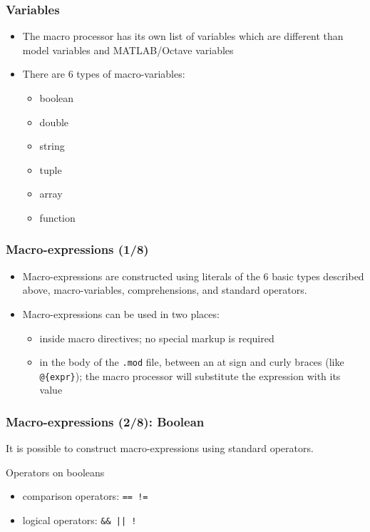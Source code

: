\documentclass{beamer}
\begin{document}
\begin{frame}
\frametitle{Variables}
\begin{itemize}
\item The macro processor has its own list of variables which are different than model variables and MATLAB/Octave variables
\item There are 6 types of macro-variables:
  \begin{itemize}
  \item boolean
  \item double
  \item string
  \item tuple
  \item array
  \item function
  \end{itemize}
\end{itemize}
\end{frame}

\begin{frame}[fragile=singleslide]
  \frametitle{Macro-expressions (1/8)}
  \begin{itemize}
    \item Macro-expressions are constructed using literals of the 6 basic types
      described above, macro-variables, comprehensions, and standard operators.
    \item Macro-expressions can be used in two places:
      \begin{itemize}
      \item inside macro directives; no special markup is required
      \item in the body of the \texttt{.mod} file, between an at sign and curly braces (like \verb+@{expr}+); the macro processor will substitute the expression with its value
      \end{itemize}
  \end{itemize}
\end{frame}


\begin{frame}[fragile=singleslide]
  \frametitle{Macro-expressions (2/8): Boolean}
  It is possible to construct macro-expressions using standard operators.
  \begin{block}{Operators on booleans}
    \begin{itemize}
    \item comparison operators: \texttt{== !=}
    \item logical operators: \verb+&& || !+
    \end{itemize}
  \end{block}
\end{frame}
\end{document}
